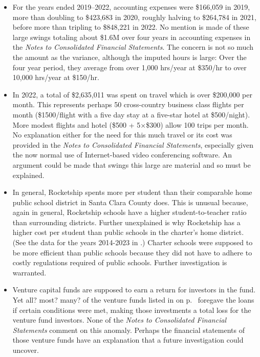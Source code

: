 \begin{itemize}
  \item  For the years ended 2019–2022, accounting expenses were \$166,059 in 2019, more than doubling to \$423,683 in 2020, roughly halving to \$264,784 in 2021, before more than tripling to \$848,221 in 2022. No mention is made of these large swings totaling about \$1.6M over four years in accounting expenses in the \textit{Notes to Consolidated Financial Statements}. The concern is not so much the amount as the variance, although the imputed hours is large: Over the four year period, they average from over 1,000 hrs/year at \$350/hr to over 10,000 hrs/year at \$150/hr.

  \item In 2022, a total of \$2,635,011 was spent on travel which is over \$200,000 per month. This represents perhaps 50 cross-country business class flights per month (\$1500/flight with a five day stay at a five-star hotel at \$500/night).  More modest flights and hotel (\$500 + 5×\$300) allow 100 trips per month.  No explanation either for the need for this much travel or its cost was provided in the \textit{Notes to Consolidated Financial Statements}, especially given the now normal use of Internet-based video conferencing software. An argument could be made that swings this large are material and so must be explained.
  
  \item In general, Rocketship spents more per student than their comparable home public school district in Santa Clara County does. This is unusual because, again in general, Rocketship schools have a higher student-to-teacher ratio than surrounding districts. Further unexplained is why Rocketship has a higher cost per student than public schools in the charter's home district. (See the data for the years 2014-2023 in \textcite{SCCOE14-23}.) Charter schools were supposed to be more efficient than public schools because they did not have to adhere to costly regulations required of public schools. Further investigation is warranted.

  \item Venture capital funds are supposed to earn a return for investors in the fund. Yet all? most? many? of the venture funds listed in  on p.~\pageref{tab:venture_captial_funding} foregave the loans if certain conditions were met, making those investments a total loss for the venture fund investors. None of the \textit{Notes to Consolidated Financial Statements} comment on this anomaly. Perhaps the financial statements of those venture funds have an explanation that a future investigation could uncover.

\end{itemize}

